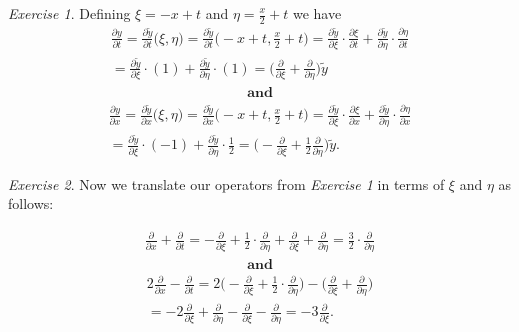 \documentclass[12pt,oneside]{amsart}
\theoremstyle{definition}
\theoremstyle{remark}
\newtheorem{exer}{Exercise}
\numberwithin{equation}{exer}
\begin{document}
\begin{exer}
Defining $\xi = -x + t$ and $\eta = \frac{x}{2} + t$ we have
\begin{align*}
    \frac{\partial y}{\partial t} 
    = \frac{\partial \tilde{y}}{\partial t} \Big(\xi , \eta\Big)
    =\frac{\partial \tilde{y}}{\partial t}\Big(-x + t,\frac{x}{2} + t \Big)
    =\frac{\partial \tilde{y}}{\partial \xi} \cdot \frac{\partial \xi}{\partial t} + \frac{\partial \tilde{y}}{\partial \eta} \cdot \frac{\partial \eta}{\partial t}\\
    =\frac{\partial \tilde{y}}{\partial \xi} \cdot (1) + \frac{\partial \tilde{y}}{\partial \eta} \cdot (1)
    = \Big(\frac{\partial}{\partial \xi} +\frac{\partial}{\partial \eta}\Big) \tilde{y}
\end{align*}
\begin{align*}
    \textbf{and}
\end{align*}
\begin{align*}
    \frac{\partial y}{\partial x} 
    = \frac{\partial \tilde{y}}{\partial x} \Big(\xi , \eta\Big)
    =\frac{\partial \tilde{y}}{\partial x}\Big(-x + t,\frac{x}{2} + t \Big)
    =\frac{\partial \tilde{y}}{\partial \xi} \cdot \frac{\partial \xi}{\partial x} + \frac{\partial \tilde{y}}{\partial \eta} \cdot \frac{\partial \eta}{\partial x}\\
    =\frac{\partial \tilde{y}}{\partial \xi} \cdot (-1) + \frac{\partial \tilde{y}}{\partial \eta} \cdot \frac{1}{2} = \Big(-\frac{\partial}{\partial \xi} + \frac{1}{2} \frac{\partial}{\partial \eta}\Big)\tilde{y}.
\end{align*}

\end{exer}
\newpage
\indent \newline
\begin{exer}
Now we translate our operators from \emph{Exercise 1} in terms of $\xi$ and $\eta$ as follows:
\end{exer}
\begin{align*}
    \frac{\partial}{\partial x} + \frac{\partial}{\partial t} = -\frac{\partial}{\partial \xi} + \frac{1}{2}\cdot \frac{\partial}{\partial \eta} + \frac{\partial}{\partial \xi} + \frac{\partial}{\partial \eta}
    = \frac{3}{2}\cdot \frac{\partial}{\partial \eta}
\end{align*}
\begin{align*}
    \textbf{and}
\end{align*}
\begin{align*}
    2\frac{\partial}{\partial x} - \frac{\partial}{\partial t} 
    = 2\Big(-\frac{\partial}{\partial \xi} + \frac{1}{2}\cdot \frac{\partial}{\partial \eta}\Big)-\Big(\frac{\partial}{\partial \xi} + \frac{\partial}{\partial \eta}\Big)\\
    = -2\frac{\partial}{\partial \xi} + \frac{\partial}{\partial \eta} - \frac{\partial}{\partial \xi} - \frac{\partial}{\partial \eta}
    =-3\frac{\partial}{\partial \xi}.
\end{align*}
\end{document}
